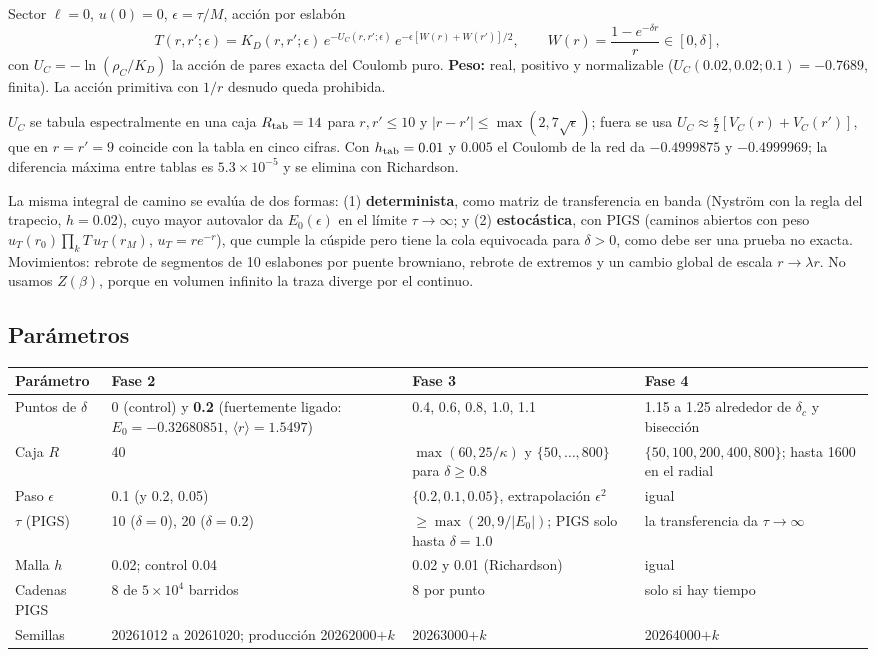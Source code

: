 \documentclass[11pt]{article}
\newcommand{\dc}{\delta_c}
\begin{document}
Sector $\ell=0$, $u(0)=0$, $\epsilon=\tau/M$, acción por eslabón
\[
T(r,r';\epsilon)=K_D(r,r';\epsilon)\,e^{-U_C(r,r';\epsilon)}\,e^{-\epsilon[W(r)+W(r')]/2},\qquad W(r)=\frac{1-e^{-\delta r}}{r}\in[0,\delta],
\]
con $U_C=-\ln(\rho_C/K_D)$ la acción de pares exacta del Coulomb puro. \textbf{Peso:} real, positivo y normalizable ($U_C(0.02,0.02;0.1)=-0.7689$, finita). La acción primitiva con $1/r$ desnudo queda prohibida.

$U_C$ se tabula espectralmente en una caja $R_{\rm tab}=14$ para $r,r'\le10$ y $|r-r'|\le\max(2,7\sqrt\epsilon)$; fuera se usa $U_C\approx\tfrac\epsilon2[V_C(r)+V_C(r')]$, que en $r=r'=9$ coincide con la tabla en cinco cifras. Con $h_{\rm tab}=0.01$ y $0.005$ el Coulomb de la red da $-0.4999875$ y $-0.4999969$; la diferencia máxima entre tablas es $5.3\times10^{-5}$ y se elimina con Richardson.

La misma integral de camino se evalúa de dos formas: (1) \textbf{determinista}, como matriz de transferencia en banda (Nyström con la regla del trapecio, $h=0.02$), cuyo mayor autovalor da $E_0(\epsilon)$ en el límite $\tau\to\infty$; y (2) \textbf{estocástica}, con PIGS (caminos abiertos con peso $u_T(r_0)\prod_kT\,u_T(r_M)$, $u_T=re^{-r}$), que cumple la cúspide pero tiene la cola equivocada para $\delta>0$, como debe ser una prueba no exacta. Movimientos: rebrote de segmentos de 10 eslabones por puente browniano, rebrote de extremos y un cambio global de escala $r\to\lambda r$. No usamos $Z(\beta)$, porque en volumen infinito la traza diverge por el continuo.

\subsection{Parámetros}

\begin{table}[H]
\centering
\small
\begin{tabular}{@{}L{2.4cm}L{3.8cm}L{3.8cm}L{3.8cm}@{}}
\toprule
\textbf{Parámetro} & \textbf{Fase 2} & \textbf{Fase 3} & \textbf{Fase 4}\\
\midrule
Puntos de $\delta$ & 0 (control) y \textbf{0.2} (fuertemente ligado: $E_0=-0.32680851$, $\langle r\rangle=1.5497$) & 0.4, 0.6, 0.8, 1.0, 1.1 & 1.15 a 1.25 alrededor de $\dc$ y bisección\\
Caja $R$ & 40 & $\max(60,25/\kappa)$ y $\{50,\dots,800\}$ para $\delta\ge0.8$ & $\{50,100,200,400,800\}$; hasta 1600 en el radial\\
Paso $\epsilon$ & 0.1 (y 0.2, 0.05) & $\{0.2,0.1,0.05\}$, extrapolación $\epsilon^2$ & igual\\
$\tau$ (PIGS) & 10 ($\delta=0$), 20 ($\delta=0.2$) & $\ge\max(20,9/|E_0|)$; PIGS solo hasta $\delta=1.0$ & la transferencia da $\tau\to\infty$\\
Malla $h$ & 0.02; control 0.04 & 0.02 y 0.01 (Richardson) & igual\\
Cadenas PIGS & 8 de $5\times10^4$ barridos & 8 por punto & solo si hay tiempo\\
Semillas & 20261012 a 20261020; producción 20262000$+k$ & 20263000$+k$ & 20264000$+k$\\
\bottomrule
\end{tabular}
\end{table}
\end{document}
